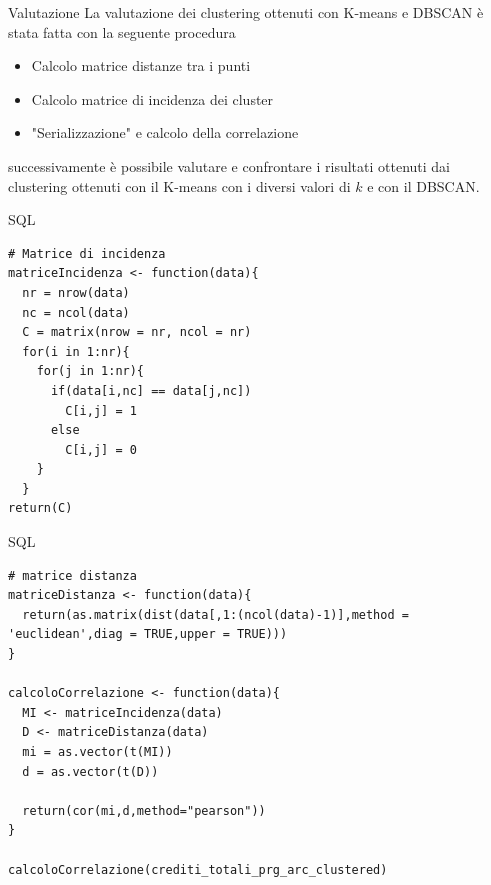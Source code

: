 \documentclass{beamer}
\begin{document}
\begin{frame}{Valutazione} 
    La valutazione dei clustering ottenuti con K-means e DBSCAN è stata fatta con la seguente procedura
    \begin{itemize}
      \item Calcolo matrice distanze tra i punti
      \item Calcolo matrice di incidenza dei cluster
      \item "Serializzazione" e calcolo della correlazione
    \end{itemize} 
    successivamente è possibile valutare e confrontare i risultati ottenuti dai clustering ottenuti
    con il K-means con i diversi valori di $k$ e con il DBSCAN.
\end{frame}

\begin{frame}[fragile]{SQL}
\begin{lstlisting}[style = R]
# Matrice di incidenza
matriceIncidenza <- function(data){
  nr = nrow(data)
  nc = ncol(data)
  C = matrix(nrow = nr, ncol = nr)
  for(i in 1:nr){
    for(j in 1:nr){
      if(data[i,nc] == data[j,nc])
        C[i,j] = 1
      else
        C[i,j] = 0
    }
  }
return(C)
\end{lstlisting}
\end{frame}

\begin{frame}[fragile]{SQL}
\begin{lstlisting}[style = R]
# matrice distanza
matriceDistanza <- function(data){
  return(as.matrix(dist(data[,1:(ncol(data)-1)],method = 'euclidean',diag = TRUE,upper = TRUE)))
}

calcoloCorrelazione <- function(data){
  MI <- matriceIncidenza(data)
  D <- matriceDistanza(data)
  mi = as.vector(t(MI))
  d = as.vector(t(D))
  
  return(cor(mi,d,method="pearson"))
}

calcoloCorrelazione(crediti_totali_prg_arc_clustered)
\end{lstlisting}
\end{frame}
\end{document}
